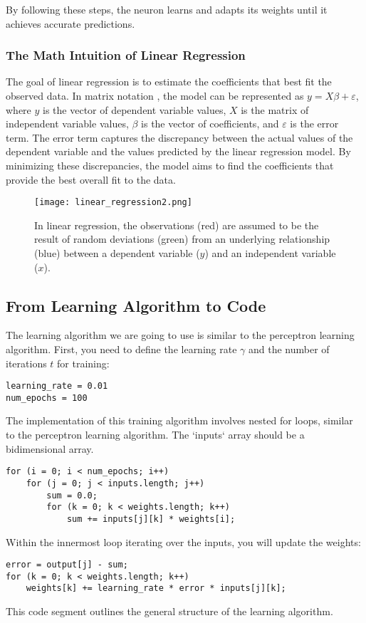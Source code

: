By following these steps, the neuron learns and adapts its weights until it achieves accurate predictions.

\subsubsection{The Math Intuition of Linear Regression}
The goal of linear regression is to estimate the coefficients that best fit the observed data. In matrix notation
, the model can be represented as $y = X\beta + \varepsilon$, where $y$ is the vector of dependent variable
values,
$X$ is the matrix of independent variable values, $\beta$ is the vector of coefficients, and $\varepsilon$ is
the error term. The error term captures the discrepancy between the actual values of the dependent variable and
the values predicted by the linear regression model. By minimizing these discrepancies, the model aims to
find the
coefficients that provide the best overall fit to the data.
\begin{figure}[H]
  \centering
  \texttt{[image: linear\_regression2.png]}
  \caption{In linear regression, the observations (red) are assumed to be the result of random deviations
    (green) from an underlying relationship (blue) between a dependent variable ($y$) and an independent
    variable ($x$).}
\end{figure}

\subsection{From Learning Algorithm to Code}
The learning algorithm we are going to use is similar to the perceptron learning algorithm.
First, you need to define the learning rate $\gamma$ and the number of iterations $t$ for training:
\begin{verbatim}
learning_rate = 0.01
num_epochs = 100
\end{verbatim}
The implementation of this training algorithm involves nested for loops, similar to the
perceptron learning algorithm. The `inputs` array should be a bidimensional array.

\begin{verbatim}
for (i = 0; i < num_epochs; i++)
    for (j = 0; j < inputs.length; j++)
        sum = 0.0;
        for (k = 0; k < weights.length; k++)
            sum += inputs[j][k] * weights[i];
\end{verbatim}
Within the innermost loop iterating over the inputs, you will update the weights:
\begin{verbatim}
error = output[j] - sum;
for (k = 0; k < weights.length; k++)
    weights[k] += learning_rate * error * inputs[j][k];
\end{verbatim}
This code segment outlines the general structure of the learning algorithm.

